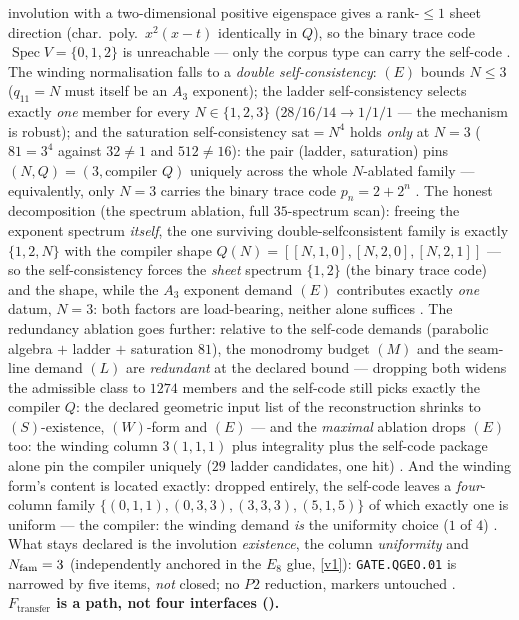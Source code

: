 \begin{winbox}
involution with a two-dimensional positive eigenspace gives a rank-$\le1$ sheet direction
(char.\ poly.\ $x^2(x-t)$ identically in $Q$), so the binary trace code
$\operatorname{Spec}V=\{0,1,2\}$ is unreachable --- only the corpus type can carry the self-code
\mE.  The winding normalisation falls to a \emph{double self-consistency}: $(E)$ bounds
$N\le3$ ($q_{11}=N$ must itself be an $A_3$ exponent); the ladder self-consistency selects
exactly \emph{one} member for every $N\in\{1,2,3\}$ ($28/16/14\to1/1/1$ --- the mechanism is
robust); and the saturation self-consistency $\mathrm{sat}=N^4$ holds \emph{only} at $N=3$
($81=3^4$ against $32\neq1$ and $512\neq16$): the pair (ladder, saturation) pins
$(N,Q)=(3,\text{compiler }Q)$ uniquely across the whole $N$-ablated family --- equivalently,
only $N=3$ carries the binary trace code $p_n=2+2^n$ \mE.  The honest decomposition (the
spectrum ablation, full $35$-spectrum scan): freeing the exponent spectrum \emph{itself}, the
one surviving double-selfconsistent family is exactly $\{1,2,N\}$ with the compiler shape
$Q(N)=[[N,1,0],[N,2,0],[N,2,1]]$ --- so the self-consistency forces the \emph{sheet} spectrum
$\{1,2\}$ (the binary trace code) and the shape, while the $A_3$ exponent demand $(E)$
contributes exactly \emph{one} datum, $N=3$: both factors are load-bearing, neither alone
suffices \mE.  The redundancy ablation goes further: relative to the self-code demands
(parabolic algebra $+$ ladder $+$ saturation $81$), the monodromy budget $(M)$ and the
seam-line demand $(L)$ are \emph{redundant} at the declared bound --- dropping both widens the
admissible class to $1274$ members and the self-code still picks exactly the compiler $Q$: the
declared geometric input list of the reconstruction shrinks to $(S)$-existence, $(W)$-form and
$(E)$ --- and the \emph{maximal} ablation drops $(E)$ too: the winding column $3(1,1,1)$ plus
integrality plus the self-code package alone pin the compiler uniquely ($29$ ladder candidates,
one hit) \mE.  And the winding form's content is located exactly: dropped entirely, the
self-code leaves a \emph{four}-column family $\{(0,1,1),(0,3,3),(3,3,3),(5,1,5)\}$ of which
exactly one is uniform --- the compiler: the winding demand \emph{is} the uniformity choice
($1$ of $4$) \mE.  What stays declared is the involution \emph{existence}, the column
\emph{uniformity} and $N_{\mathrm{fam}}=3$ (independently anchored in the $E_8$ glue, \vref{v1}):
\texttt{GATE.QGEO.01} is narrowed by five items, \emph{not} closed; no $P2$ reduction,
markers untouched \mC.
\smallskip\\
\noindent\textbf{$F_{\mathrm{transfer}}$ is a path, not four interfaces ().}

\end{winbox}
